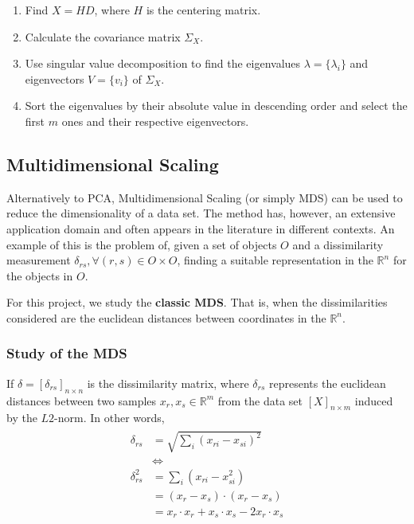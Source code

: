 \documentclass[12pt]{article}
\begin{document}
\begin{enumerate}
	\item Find $X=HD$, where $H$ is the centering matrix.

	\item Calculate the covariance matrix $\Sigma_X$.

	\item Use singular value decomposition to find the eigenvalues $\lambda = \{\lambda_i\}$ and eigenvectors $V = \{v_i\}$ of $\Sigma_X$.

	\item Sort the eigenvalues by their absolute value in descending order and select the first $m$ ones and their respective eigenvectors.
\end{enumerate}

\subsection{Multidimensional Scaling}

Alternatively to PCA, Multidimensional Scaling (or simply MDS) can be used to reduce the dimensionality of a data set. The method has, however, an extensive application domain and often appears in the literature in different contexts. An example of this is the problem of, given a set of objects $O$ and a dissimilarity measurement $\delta_{rs}, \forall (r, s) \in O\times O$, finding a suitable representation in the $\mathbb{R}^n$ for the objects in $O$. \cite{cox2001}

For this project, we study the \textbf{classic MDS}. That is, when the dissimilarities considered are the euclidean distances between coordinates in the $\mathbb{R}^n$.

\subsubsection{Study of the MDS}

If $\delta = [\delta_{rs}]_{n\times n}$ is the dissimilarity matrix, where $\delta_{rs}$ represents the euclidean distances between two samples $x_r, x_s\in \mathbb{R}^m$ from the data set $[X]_{n\times m}$ induced by the $L2$-norm. In other words,
\begin{align}
\label{eq:basemds}
\begin{split}
  \delta_{rs}  &= \sqrt{\sum_i (x_{ri}-x_{si})^2} \\
  &\iff \\
  \delta_{rs}^2 &= \sum_i (x_{ri}-x_{si}^2) \\
  &= (x_r-x_s)\cdot (x_r-x_s) \\
  &= x_r\cdot x_r + x_s\cdot x_s -2x_r\cdot x_s
\end{split}
\end{align}
\end{document}
